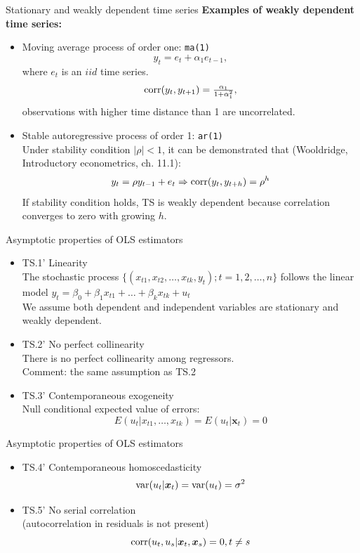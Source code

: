 \documentclass{beamer}
\begin{document}
\begin{frame}{Stationary and weakly dependent time series}
\textbf{Examples of weakly dependent time series:}
\bigskip
\begin{itemize}
\item Moving average process of order one: \texttt{ma(1)}
$$y_t=e_t+\alpha_1 e_{t-1},$$
where $e_t$ is an $\textit{iid}$ time series.\\ $$\textnormal{corr}(y_t,y_{t+1})=\tfrac{\alpha_1}{1+\alpha_1^2},$$ observations with higher time distance than 1 are uncorrelated.
\bigskip
\item Stable autoregressive process of order 1: \texttt{ar(1)}\\
\medskip
Under stability condition $|\rho|<1$, it can be demonstrated that (Wooldridge, Introductory econometrics, ch. 11.1):
$$y_t=\rho y_{t-1} + e_t \Rightarrow \textnormal{corr}(y_t,y_{t+h})=\rho^h$$
If stability condition holds, TS is weakly dependent because correlation converges  to zero with growing $h$.
\end{itemize}
\end{frame}
\begin{frame}{Asymptotic properties of OLS estimators}
\begin{itemize}
\item TS.1' Linearity \\The stochastic process 
$\{(x_{t1},x_{t2},\dots,x_{tk},y_t);t=1,2,\dots, n\}$ follows the linear model $ y_t = \beta_0 + \beta_1 x_{t1} + \dots + \beta_k x_{tk}+u_t$ 
\\ \vspace{0.1cm} We assume both dependent and independent variables are stationary and weakly dependent.
\medskip
\item TS.2' No perfect collinearity \\
There is no perfect collinearity among regressors. \\
{\footnotesize Comment: the same assumption as TS.2}
\medskip
\item TS.3' Contemporaneous exogeneity 
\\Null conditional expected value of errors: 
$$E(u_t|x_{t1},\dots,x_{tk})=E(u_t|\boldsymbol{x}_t)=0$$
\end{itemize}
\end{frame}
\begin{frame}{Asymptotic properties of OLS estimators}
\begin{itemize}
\item TS.4' Contemporaneous homoscedasticity
$$\textnormal{var}(u_t|\boldsymbol{x}_t)=\textnormal{var}(u_t)=\sigma^2$$
\vspace{0.5cm}
\item TS.5' No serial correlation \\(autocorrelation in residuals is not present)
$$\textnormal{corr}(u_t,u_s|\boldsymbol{x}_t,\boldsymbol{x}_s ) = 0, t\neq s$$
\end{itemize}
\end{frame}
\end{document}

